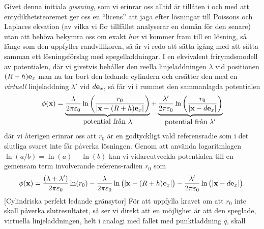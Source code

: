 {{Givet denna initiala {\it gissning}, som vi erinrar oss alltid {\"a}r
till{\aa}ten i och med att entydikhetsteoremet ger oss en ``licens'' att jaga
efter l{\"o}sningar till Poissons och Laplaces ekvation (av vilka vi f{\"o}r
tillf{\"a}llet analyserar en dom{\"a}n f{\"o}r den senare) utan att beh{\"o}va
bekymra oss om exakt {\it hur} vi kommer fram till en l{\"o}sning, s{\aa}
l{\"a}nge som den uppfyller randvillkoren, s{\aa} {\"a}r vi redo att s{\"a}tta
ig{\aa}ng med att s{\"a}tta samman ett l{\"o}sningsf{\"o}rslag med
spegelladdningar. I en ekvivalent frirymdsmodell av potentialen, d{\"a}r vi
givetvis beh{\aa}ller den reella linjeladdningen $\lambda$ vid positionen
$(R+h){\bf e}_x$ man nu tar bort den ledande cylindern och ers{\"a}tter den med
en {\it virtuell} linjeladdning $\lambda'$ vid $d{\bf e}_x$, s{\aa} f{\aa}r vi
i rummet den sammanlagda potentialen
$$
  \phi({\bf x})
    =\underbrace{
        {{\lambda}\over{2\pi\varepsilon_0}}
          \ln\bigg({{r_0}\over{|{\bf x}-(R+h){\bf e}_x|}}\bigg)
     }_{\hbox{potential fr{\aa}n $\lambda$}}
    +\underbrace{
        {{\lambda'}\over{2\pi\varepsilon_0}}
          \ln\bigg({{r_0}\over{|{\bf x}-d{\bf e}_x|}}\bigg)
     }_{\hbox{potential fr{\aa}n $\lambda'$}}
$$
d{\"a}r vi {\aa}terigen erinrar oss att $r_0$ {\"a}r en godtyckligt vald
referensradie som i det slutliga svaret inte f{\aa}r p{\aa}verka
l{\"o}sningen.
Genom att anv{\"a}nda logaritmlagen $\ln(a/b)=\ln(a)-\ln(b)$ kan vi
vidareutveckla potentialen till en gemensam term involverande referens-radien
$r_0$ som
$$
  \phi({\bf x})
    ={{(\lambda+\lambda')}\over{2\pi\varepsilon_0}}\ln(r_0)
    -{{\lambda}\over{2\pi\varepsilon_0}}
          \ln\big(|{\bf x}-(R+h){\bf e}_x|\big)
    -{{\lambda'}\over{2\pi\varepsilon_0}}
          \ln\big(|{\bf x}-d{\bf e}_x|\big).
$$
[Cylindriska perfekt ledande gr{\"a}nsytor]
F{\"o}r att uppfylla kravet om att $r_0$ inte skall p{\aa}verka slutresultatet,
s{\aa} ser vi direkt att en m{\"o}jlighet {\"a}r att den speglade, virtuella
linjeladdningen, helt i analogi med fallet med punktladdning $q$, skall
}}
